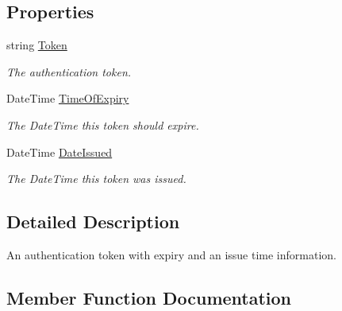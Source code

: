 \subsection*{Properties}
\begin{DoxyCompactItemize}
\item 
string \hyperlink{interfaceCqrs_1_1Authentication_1_1ISingleSignOnToken_aba74aff1a43375dce8d80fa94a94a57b_aba74aff1a43375dce8d80fa94a94a57b}{Token}
\begin{DoxyCompactList}\small\item\em The authentication token. \end{DoxyCompactList}\item 
Date\+Time \hyperlink{interfaceCqrs_1_1Authentication_1_1ISingleSignOnToken_a50af484569cc78f88acb01f1938a7cd8_a50af484569cc78f88acb01f1938a7cd8}{Time\+Of\+Expiry}
\begin{DoxyCompactList}\small\item\em The Date\+Time this token should expire. \end{DoxyCompactList}\item 
Date\+Time \hyperlink{interfaceCqrs_1_1Authentication_1_1ISingleSignOnToken_a0c41d76beea893838e556fba8dbc59db_a0c41d76beea893838e556fba8dbc59db}{Date\+Issued}
\begin{DoxyCompactList}\small\item\em The Date\+Time this token was issued. \end{DoxyCompactList}\end{DoxyCompactItemize}


\subsection{Detailed Description}
An authentication token with expiry and an issue time information. 



\subsection{Member Function Documentation}
\mbox{\label{interfaceCqrs_1_1Authentication_1_1ISingleSignOnToken_af34e8c0b052865d687064d3381bfbcdb_af34e8c0b052865d687064d3381bfbcdb}} 
